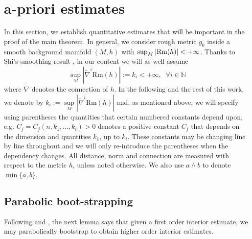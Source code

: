 \documentclass[12pt]{amsart}
\newcommand{\hdel}{\tilde{\nabla}}
\theoremstyle{remark}
\numberwithin{equation}{section}
\def\Rm{\text{\rm Rm}}
\begin{document}
\section{a-priori estimates}


In this section, we establish quantitative estimates that will be important in the proof of the main theorem. In general, we consider rough metric $g_0$ inside a smooth background manifold $(M,h)$ with $\sup_M|\Rm(h)|<+\infty$. Thanks to Shi's smoothing result \cite{shi_deforming_1989}, in our content we will as well assume  
\begin{equation}\label{eqn:h-remark-curvature-estimates}
  \sup\limits_{M}|\hdel^i\text{Rm}(h)|:=k_i<+\infty,\;\; \forall i\in \mathbb{N}
\end{equation}
where $\hdel$ denotes the connection of $h$. In the following and the rest of this work, we denote by $k_i := \sup\limits_M|\hdel^i\text{Rm}(h)|$ and, as mentioned above, we will specify using parentheses the quantities that certain numbered constants depend upon, e.g. $C_j = C_j(n,k_1,\dots,k_i) > 0$ denotes a positive constant $C_j$ that depends on the dimension and quantities $k_1$, up to $k_i$. These constants may be changing line by line throughout and we will only re-introduce the parentheses when the dependency changes.
All distance, norm and connection are measured with respect to the metric $h$, unless noted otherwise. We also use $a\wedge b$ to denote $\min\{a,b\}$.

\subsection{Parabolic boot-strapping}

Following \cite{shi_deforming_1989} and \cite{simon_deformation_2002}, the next lemma says that given a first order interior estimate, we may parabolically bootstrap to obtain higher order interior estimates.
\end{document}
